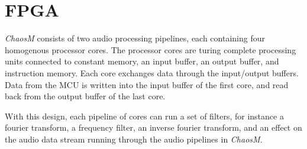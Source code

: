 \FloatBarrier
\section{FPGA}\label{chapter:fpga}

\textit{ChaosM} consists of two audio processing pipelines, each containing four
homogenous processor cores. The processor cores are turing complete processing
units connected to constant memory, an input buffer, an output buffer, and
instruction memory. Each core exchanges data through the input/output buffers.
Data from the MCU is written into the input buffer of the first core, and read
back from the output buffer of the last core.

With this design, each pipeline of cores can run a set of filters, for instance
a fourier transform, a frequency filter, an inverse fourier transform, and an
effect on the audio data stream running through the audio pipelines in \textit{ChaosM}.







